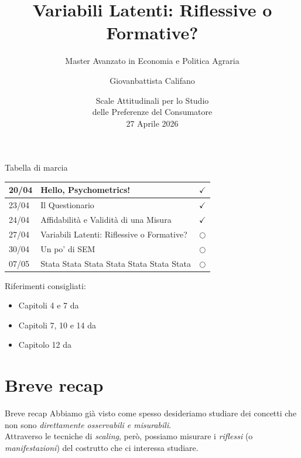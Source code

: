 \documentclass{beamer}
\title[Lezione 4]{Variabili Latenti: Riflessive o Formative?}
\subtitle{Master Avanzato in Economia e Politica Agraria}
\author{Giovanbattista Califano}
\date[Portici, 27/04/2026]{Scale Attitudinali per lo Studio \\ delle Preferenze del Consumatore \\27 Aprile 2026}
\institute[UNINA]{Università degli Studi di Napoli Federico II, giovanbattista.califano@unina.it}
\begin{document}
\frame{\titlepage}

\begin{frame}{Tabella di marcia}
    \begin{center}
        \begin{tabular}{|l|l|c|}
        \hline
        20/04 &  Hello, Psychometrics! & $\checkmark$ \\
        \hline
        23/04 &  Il Questionario & $\checkmark$ \\
        \hline
        24/04 & Affidabilità e Validità di una Misura & $\checkmark$ \\
        \hline
        27/04 & Variabili Latenti: Riflessive o Formative? & $\bigcirc$ \\
        \hline
        30/04 & Un po' di SEM & $\bigcirc$ \\
        \hline
        07/05 & Stata Stata Stata Stata Stata Stata Stata & $\bigcirc$ \\
        \hline
        \end{tabular}
    \end{center}
\vspace{0.1cm}
\footnotesize
Riferimenti consigliati: \\
\begin{itemize}
    \item Capitoli 4 e 7 da \cite{jhangiani2019research}
    \item Capitoli 7, 10 e 14 da \cite{olivero2022psicologia}
    \item Capitolo 12 da \cite{mehmetoglu2022applied}
\end{itemize}
\scriptsize


\end{frame}

\section{Breve recap}
\begin{frame}{Breve recap}
    Abbiamo già visto come spesso desideriamo studiare dei concetti che non sono \textit{direttamente osservabili e misurabili}. \\
    \vspace{1em}
    Attraverso le tecniche di \textit{scaling}, però, possiamo misurare i \textit{riflessi} (o \textit{manifestazioni}) del costrutto che ci interessa studiare.
\end{frame}
\end{document}
